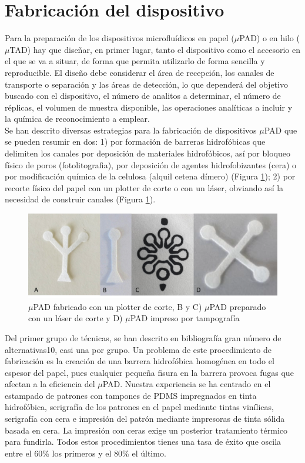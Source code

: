 \documentclass{article}
\begin{document}
\section{Fabricación del dispositivo}

Para la preparación de los dispositivos microfluídicos en papel ($\mu$PAD) o en hilo ($\mu$TAD) hay que diseñar, en primer lugar, tanto el dispositivo como el accesorio en el que se va a situar, de forma que permita utilizarlo de forma sencilla y reproducible. El diseño debe considerar el área de recepción, los canales de transporte o separación y las áreas de detección, lo que dependerá del objetivo buscado con el dispositivo, el número de analitos a determinar, el número de réplicas, el volumen de muestra disponible, las operaciones analíticas a incluir y la química de reconocimiento a emplear.\\

Se han descrito diversas estrategias para la fabricación de dispositivos $\mu$PAD que se pueden resumir en dos: 1) por formación de barreras hidrofóbicas que delimiten los canales por deposición de materiales hidrofóbicos, así por bloqueo físico de poros (fotolitografia), por deposición de agentes hidrofobizantes (cera) o por modificación química de la celulosa (alquil cetena dímero) (Figura \ref{fig:papel}); 2) por recorte físico del papel con un plotter de corte o con un láser, obviando así la necesidad de construir canales\cite{Cate2015} (Figura \ref{fig:papel}).\\


\begin{figure}[h]
\includegraphics[width=\textwidth]{papel}
\caption{ $\mu$PAD fabricado con un plotter de corte, B y C) $\mu$PAD preparado con un láser de corte y D) $\mu$PAD impreso por tampografía}
\label{fig:papel}
\end{figure}

Del primer grupo de técnicas, se han descrito en bibliografía gran número de alternativas10, casi una por grupo. Un problema de este procedimiento de fabricación es la creación de una barrera hidrofóbica homogénea en todo el espesor del papel, pues cualquier pequeña fisura en la barrera provoca fugas que afectan a la eficiencia del $\mu$PAD. Nuestra experiencia se ha centrado en el estampado de patrones con tampones de PDMS impregnados en tinta hidrofóbica, serigrafía de los patrones en el papel mediante tintas vinílicas, serigrafía con cera e impresión del patrón mediante impresoras de tinta sólida basada en cera\cite{Lopez-Ruiz2014}. La impresión con ceras exige un posterior tratamiento térmico para fundirla. Todos estos procedimientos tienes una tasa de éxito que oscila entre el 60\% los primeros y el 80\% el último.\\ 
\end{document}

